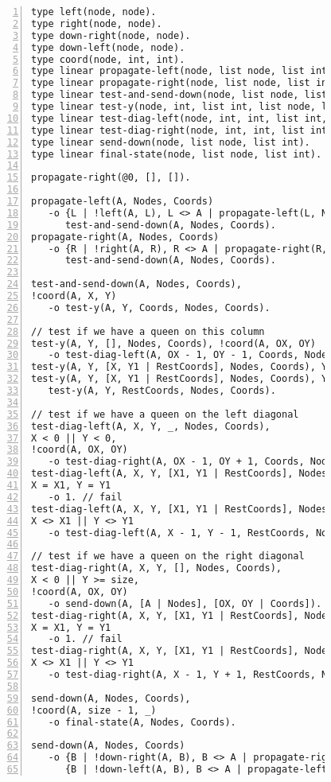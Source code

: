 \begin{figure}[h!]
\scriptsize\begin{Verbatim}[numbers=left]
type left(node, node).
type right(node, node).
type down-right(node, node).
type down-left(node, node).
type coord(node, int, int).
type linear propagate-left(node, list node, list int).
type linear propagate-right(node, list node, list int).
type linear test-and-send-down(node, list node, list int).
type linear test-y(node, int, list int, list node, list int).
type linear test-diag-left(node, int, int, list int, list node, list int).
type linear test-diag-right(node, int, int, list int, list node, list int).
type linear send-down(node, list node, list int).
type linear final-state(node, list node, list int).

propagate-right(@0, [], []).

propagate-left(A, Nodes, Coords)
   -o {L | !left(A, L), L <> A | propagate-left(L, Nodes, Coords)},
      test-and-send-down(A, Nodes, Coords).
propagate-right(A, Nodes, Coords)
   -o {R | !right(A, R), R <> A | propagate-right(R, Nodes, Coords)},
      test-and-send-down(A, Nodes, Coords).

test-and-send-down(A, Nodes, Coords),
!coord(A, X, Y)
   -o test-y(A, Y, Coords, Nodes, Coords).

// test if we have a queen on this column
test-y(A, Y, [], Nodes, Coords), !coord(A, OX, OY)
   -o test-diag-left(A, OX - 1, OY - 1, Coords, Nodes, Coords).
test-y(A, Y, [X, Y1 | RestCoords], Nodes, Coords), Y = Y1 -o 1. // fail
test-y(A, Y, [X, Y1 | RestCoords], Nodes, Coords), Y <> Y1 -o
   test-y(A, Y, RestCoords, Nodes, Coords).

// test if we have a queen on the left diagonal
test-diag-left(A, X, Y, _, Nodes, Coords),
X < 0 || Y < 0,
!coord(A, OX, OY)
   -o test-diag-right(A, OX - 1, OY + 1, Coords, Nodes, Coords).
test-diag-left(A, X, Y, [X1, Y1 | RestCoords], Nodes, Coords),
X = X1, Y = Y1
   -o 1. // fail
test-diag-left(A, X, Y, [X1, Y1 | RestCoords], Nodes, Coords),
X <> X1 || Y <> Y1
   -o test-diag-left(A, X - 1, Y - 1, RestCoords, Nodes, Coords).

// test if we have a queen on the right diagonal
test-diag-right(A, X, Y, [], Nodes, Coords),
X < 0 || Y >= size,
!coord(A, OX, OY)
   -o send-down(A, [A | Nodes], [OX, OY | Coords]). // add new queen
test-diag-right(A, X, Y, [X1, Y1 | RestCoords], Nodes, Coords),
X = X1, Y = Y1
   -o 1. // fail
test-diag-right(A, X, Y, [X1, Y1 | RestCoords], Nodes, Coords),
X <> X1 || Y <> Y1
   -o test-diag-right(A, X - 1, Y + 1, RestCoords, Nodes, Coords).

send-down(A, Nodes, Coords),
!coord(A, size - 1, _)
   -o final-state(A, Nodes, Coords).

send-down(A, Nodes, Coords)
   -o {B | !down-right(A, B), B <> A | propagate-right(B, Nodes, Coords)},
      {B | !down-left(A, B), B <> A | propagate-left(B, Nodes, Coords)}.
\end{Verbatim}
\end{figure}
\normalsize


